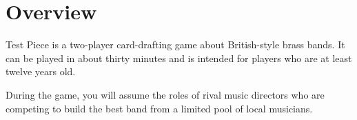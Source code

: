 \documentclass[a6paper, 12pt, parskip=half, DIV=14]{scrartcl}
\begin{document}
\begin{titlepage}

\enlargethispage{3.5\baselineskip}
\Large
\setmainfont[Scale=1.05]{Playball}
\phantom{test}
\vfill
\begin{center}
\end{center}
\end{titlepage}


\ClearShipoutPicture
\enlargethispage{1.75\baselineskip}
\section*{Overview}
Test Piece is a two-player card-drafting game about British-style brass bands. It can be played in about thirty minutes and is intended for players who are at least twelve years old.

During the game, you will assume the roles of rival music directors who are competing to build the best band from a limited pool of local musicians.

\vspace{0.1cm}
\end{document}

